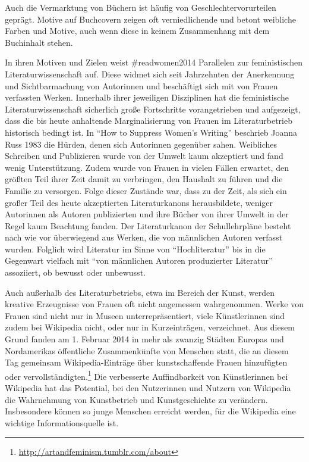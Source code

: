 \documentclass[a4paper,
fontsize=11pt,
oneside,
numbers=noperiodatend,
parskip=half-,
bibliography=totoc,
final
]{scrartcl}
\begin{document}
Auch die Vermarktung von Büchern ist häufig von Geschlechtervorurteilen
geprägt. Motive auf Buchcovern zeigen oft verniedlichende und betont
weibliche Farben und Motive, auch wenn diese in keinem Zusammenhang mit
dem Buchinhalt stehen.~

In ihren Motiven und Zielen weist \#readwomen2014 Parallelen zur
feministischen Literaturwissenschaft auf. Diese widmet sich seit
Jahrzehnten der Anerkennung und Sichtbarmachung von Autorinnen und
beschäftigt sich mit von Frauen verfassten Werken. Innerhalb ihrer
jeweiligen Disziplinen hat die feministische Literaturwissenschaft
sicherlich große Fortschritte vorangetrieben und aufgezeigt, dass die
bis heute anhaltende Marginalisierung von Frauen im Literaturbetrieb
historisch bedingt ist. In \enquote{How to Suppress Women's Writing}
beschrieb Joanna Russ 1983 die Hürden, denen sich Autorinnen gegenüber
sahen. Weibliches Schreiben und Publizieren wurde von der Umwelt kaum
akzeptiert und fand wenig Unterstützung. Zudem wurde von Frauen in
vielen Fällen erwartet, den größten Teil ihrer Zeit damit zu verbringen,
den Haushalt zu führen und die Familie zu versorgen. Folge dieser
Zustände war, dass zu der Zeit, als sich ein großer Teil des heute
akzeptierten Literaturkanons herausbildete, weniger Autorinnen als
Autoren publizierten und ihre Bücher von ihrer Umwelt in der Regel kaum
Beachtung fanden. Der Literaturkanon der Schullehrpläne besteht nach wie
vor überwiegend aus Werken, die von männlichen Autoren verfasst wurden.
Folglich wird Literatur im Sinne von \enquote{Hochliteratur} bis in die
Gegenwart vielfach mit \enquote{von männlichen Autoren produzierter
Literatur} assoziiert, ob bewusst oder unbewusst.~

Auch außerhalb des Literaturbetriebs, etwa im Bereich der Kunst, werden
kreative Erzeugnisse von Frauen oft nicht angemessen wahrgenommen. Werke
von Frauen sind nicht nur in Museen unterrepräsentiert, viele
Künstlerinnen sind zudem bei Wikipedia nicht, oder nur in Kurzeinträgen,
verzeichnet. Aus diesem Grund fanden am 1. Februar 2014 in mehr als
zwanzig Städten Europas und Nordamerikas öffentliche Zusammenkünfte von
Menschen statt, die an diesem Tag gemeinsam Wikipedia-Einträge über
kunstschaffende Frauen hinzufügten oder vervollständigten.\footnote{\url{http://artandfeminism.tumblr.com/about}}
Die verbesserte Auffindbarkeit von Künstlerinnen bei Wikipedia hat das
Potential, bei den Nutzerinnen und Nutzern von Wikipedia die Wahrnehmung
von Kunstbetrieb und Kunstgeschichte zu verändern. Insbesondere können
so junge Menschen erreicht werden, für die Wikipedia eine wichtige
Informationsquelle ist.
\end{document}

